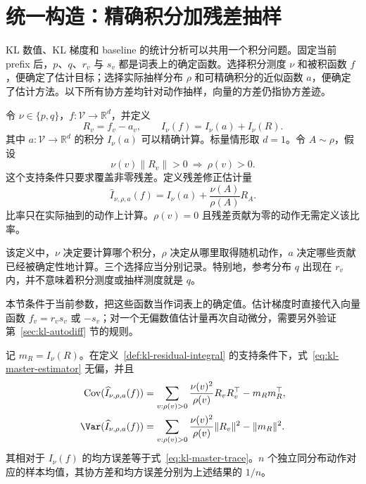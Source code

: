 \section{统一构造：精确积分加残差抽样}
\label{sec:kl-residual-framework}

KL 数值、KL 梯度和 baseline 的统计分析可以共用一个积分问题。固定当前 prefix 后，$p$、$q$、$r_v$ 与 $s_v$ 都是词表上的确定函数。选择积分测度 $\nu$ 和被积函数 $f$，便确定了估计目标；选择实际抽样分布 $\rho$ 和可精确积分的近似函数 $a$，便确定了估计方法。以下所有协方差均针对动作抽样，向量的方差仍指协方差迹。

\begin{definition}[可精确积分的近似函数与残差]
\label{def:kl-residual-integral}
令 $\nu\in\{p,q\}$，$f:\mathcal V\to\mathbb R^d$，并定义
\[
 R_v=f_v-a_v,\qquad I_\nu(f)=I_\nu(a)+I_\nu(R).
\]
其中 $a:\mathcal V\to\mathbb R^d$ 的积分 $I_\nu(a)$ 可以精确计算。标量情形取 $d=1$。令 $A\sim\rho$，假设
\[
 \nu(v)\lVert R_v\rVert>0\ \Longrightarrow\ \rho(v)>0.
\]
这个支持条件只要求覆盖非零残差。定义残差修正估计量
\begin{equation}
 \widehat I_{\nu,\rho,a}(f)
 =I_\nu(a)+\frac{\nu(A)}{\rho(A)}R_A.
 \label{eq:kl-master-estimator}
\end{equation}
比率只在实际抽到的动作上计算。$\rho(v)=0$ 且残差贡献为零的动作无需定义该比率。
\end{definition}

该定义中，$\nu$ 决定要计算哪个积分，$\rho$ 决定从哪里取得随机动作，$a$ 决定哪些贡献已经被确定性地计算。三个选择应当分别记录。特别地，参考分布 $q$ 出现在 $r_v$ 内，并不意味着积分测度或抽样测度就是 $q$。

本节条件于当前参数，把这些函数当作词表上的确定值。估计梯度时直接代入向量函数 $f_v=r_vs_v$ 或 $-s_v$；对一个无偏数值估计量再次自动微分，需要另外验证第~\ref{sec:kl-autodiff} 节的规则。

\begin{theorem}
\label{thm:kl-master-moments}
记 $m_R=I_\nu(R)$。在定义~\ref{def:kl-residual-integral} 的支持条件下，式~\eqref{eq:kl-master-estimator} 无偏，并且
\begin{align}
 \operatorname{Cov}(\widehat I_{\nu,\rho,a}(f))
 &=\sum_{v:\rho(v)>0}\frac{\nu(v)^2}{\rho(v)}R_vR_v^\top-m_Rm_R^\top,
 \label{eq:kl-master-cov}\\
 \Var(\widehat I_{\nu,\rho,a}(f))
 &=\sum_{v:\rho(v)>0}\frac{\nu(v)^2}{\rho(v)}\lVert R_v\rVert^2-\lVert m_R\rVert^2.
 \label{eq:kl-master-trace}
\end{align}
其相对于 $I_\nu(f)$ 的均方误差等于式~\eqref{eq:kl-master-trace}。$n$ 个独立同分布动作对应的样本均值，其协方差和均方误差分别为上述结果的 $1/n$。
\end{theorem}

